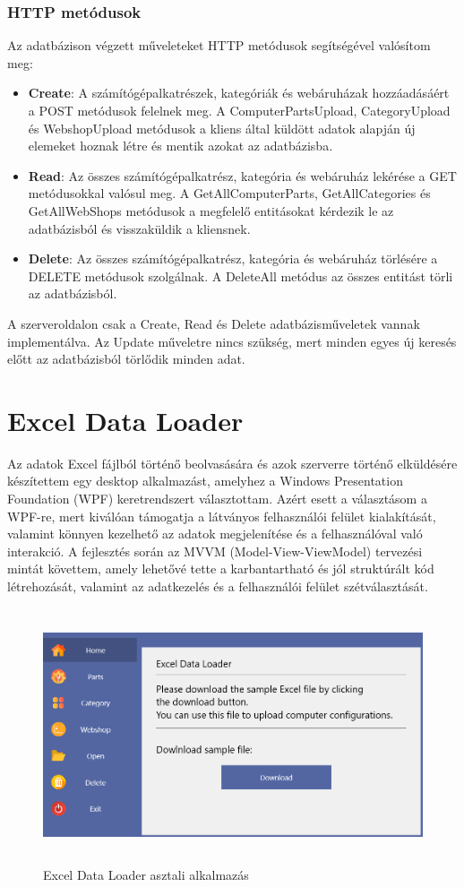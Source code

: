 \documentclass[
]{thesis-ekf}
\theoremstyle{definition}
\theoremstyle{remark}
\begin{document}
\subsubsection{HTTP metódusok}
Az adatbázison végzett műveleteket HTTP metódusok segítségével valósítom meg:
\begin{itemize}
	\item \textbf{Create}: A számítógépalkatrészek, kategóriák és webáruházak hozzáadásáért a POST metódusok felelnek meg. A ComputerPartsUpload, CategoryUpload és WebshopUpload metódusok a kliens által küldött adatok alapján új elemeket hoznak létre és mentik azokat az adatbázisba.

	\item \textbf{Read}: Az összes számítógépalkatrész, kategória és webáruház lekérése a GET metódusokkal valósul meg. A GetAllComputerParts, GetAllCategories és GetAllWebShops metódusok a megfelelő entitásokat kérdezik le az adatbázisból és visszaküldik  a kliensnek.

	\item \textbf{Delete}: Az összes számítógépalkatrész, kategória és webáruház törlésére a DELETE metódusok szolgálnak. A DeleteAll metódus az összes entitást törli az adatbázisból.
\end{itemize}
A szerveroldalon csak a Create, Read és Delete adatbázisműveletek vannak implementálva. Az Update műveletre nincs szükség, mert minden egyes új keresés előtt az adatbázisból törlődik minden adat.



\section{Excel Data Loader}
Az adatok Excel fájlból történő beolvasására és azok szerverre történő elküldésére készítettem egy desktop alkalmazást, amelyhez a Windows Presentation Foundation (WPF) keretrendszert választottam. Azért esett a választásom a WPF-re, mert kiválóan támogatja a látványos felhasználói felület kialakítását, valamint könnyen kezelhető az adatok megjelenítése és a felhasználóval való interakció. A fejlesztés során az MVVM (Model-View-ViewModel) tervezési mintát követtem, amely lehetővé tette a karbantartható és jól struktúrált kód létrehozását, valamint az adatkezelés és a felhasználói felület szétválasztását. 
\begin{figure}[!ht]
	\centering
	\includegraphics[width=15cm, height=7.5cm]{ExcelDataLoader}
	\caption{Excel Data Loader asztali alkalmazás}
	\label{picture-ExcelDataLoader}
\end{figure}
\end{document}
